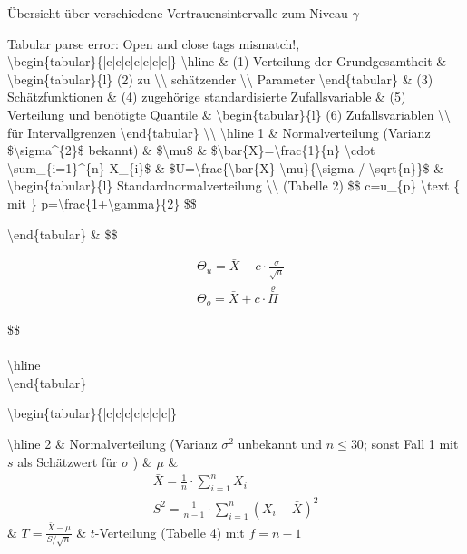 \documentclass[10pt]{article}
\begin{document}
Übersicht über verschiedene Vertrauensintervalle zum Niveau $\gamma$

Tabular parse error: Open and close tags mismatch!,\\
\textbackslash begin\{tabular\}\{|c|c|c|c|c|c|c|\}
\textbackslash hline \& (1) Verteilung der Grundgesamtheit \& \textbackslash begin\{tabular\}\{l\}
(2) zu \textbackslash \textbackslash 
schätzender \textbackslash \textbackslash 
Parameter
\textbackslash end\{tabular\} \& (3) Schätzfunktionen \& (4) zugehörige standardisierte Zufallsvariable \& (5) Verteilung und benötigte Quantile \& \textbackslash begin\{tabular\}\{l\}
(6) Zufallsvariablen \textbackslash \textbackslash 
für Intervallgrenzen
\textbackslash end\{tabular\} \textbackslash \textbackslash 
\textbackslash hline 1 \& Normalverteilung (Varianz \$\textbackslash sigma\^{}\{2\}\$ bekannt) \& \$\textbackslash mu\$ \& \$\textbackslash bar\{X\}=\textbackslash frac\{1\}\{n\} \textbackslash cdot \textbackslash sum\_\{i=1\}\^{}\{n\} X\_\{i\}\$ \& \$U=\textbackslash frac\{\textbackslash bar\{X\}-\textbackslash mu\}\{\textbackslash sigma / \textbackslash sqrt\{n\}\}\$ \& \textbackslash begin\{tabular\}\{l\}
Standardnormalverteilung \textbackslash \textbackslash 
(Tabelle 2)
\$\$
c=u\_\{p\} \textbackslash text \{ mit \} p=\textbackslash frac\{1+\textbackslash gamma\}\{2\}
\$\$

\textbackslash end\{tabular\} \& \$\$

\[
\begin{aligned}
& \Theta_{u}=\bar{X}-c \cdot \frac{\sigma}{\sqrt{n}} \\
& \Theta_{o}=\bar{X}+c \cdot \stackrel{\varrho}{\Pi}
\end{aligned}
\]

\$\$ \\
\\
\textbackslash hline\\
\textbackslash end\{tabular\}

\textbackslash begin\{tabular\}\{|c|c|c|c|c|c|c|\}

\textbackslash hline 2 \& Normalverteilung (Varianz $\sigma^{2}$ unbekannt und $n \leq 30$; sonst Fall 1 mit $s$ als Schätzwert für $\sigma$ ) \& $\mu$ \& $$
\begin{gathered}
\bar{X}=\frac{1}{n} \cdot \sum_{i=1}^{n} X_{i} \\
S^{2}=\frac{1}{n-1} \cdot \sum_{i=1}^{n}\left(X_{i}-\bar{X}\right)^{2}
\end{gathered}
$$ \& $T=\frac{\bar{X}-\mu}{S / \sqrt{n}}$ \& $t$-Verteilung (Tabelle 4) mit $f=n-1$
\end{document}
